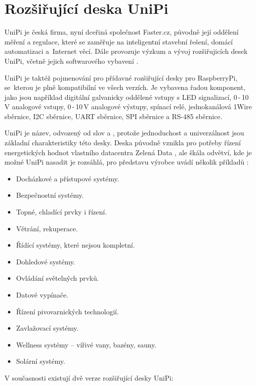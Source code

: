 \chapter{Rozšiřující deska UniPi}
\label{KapUnipi}

UniPi je česká firma, nyní dceřiná společnost Faster.cz, původně její oddělení měření a regulace, které se zaměřuje na inteligentní stavební řešení, domácí automatizaci a~Internet věcí. Dále provozuje výzkum a vývoj rozšiřujicích desek UniPi, včetně jejich softwarového vybavení \cite{UniPi}.

UniPi je taktéž pojmenování pro přídavné rozšiřující desky pro RaspberryPi, se~kterou je plně kompatibilní ve všech verzích. Je vybavena řadou komponent, jako jsou například digitální galvanicky oddělené vstupy s LED signalizací, 0\,-\,10\,V analogové vstupy, 0\,-\,10\,V analogové výstupy, spínací relé, jednokanálová 1Wire sběrnice, I2C sběrnice, UART sběrnice, SPI sběrnice a RS-485 sběrnice.

UniPi je název, odvozený od slov  a , protože jednoduchost a univerzálnost jsou základní charakteristiky této desky. Deska původně vznikla pro potřeby řízení energetických hodnot vlastního datacentra Zelená Data \cite{ZelenaData}, ale škála odvětví, kde je možné UniPi nasadit je rozsáhlá, pro představu výrobce uvádí několik příkladů \cite{UniPi}:
\begin{itemize}
	\item Docházkové a přístupové systémy.
	\item Bezpečnostní systémy.
	\item Topné, chladící prvky i řízení.
	\item Větrání, rekuperace.
	\item Řídící systémy, které nejsou kompletní.
	\item Dohledové systémy.
	\item Ovládání světelných prvků.
	\item Datové vypínače.
	\item Řízení pivovarnických technologií.
	\item Zavlažovací systémy.
	\item Wellness systémy – vířivé vany, bazény, sauny.
	\item Solární systémy.
\end{itemize}

\vspace{5mm}
\noindent
 V současnosti existují dvě verze rozšiřující desky UniPi:


